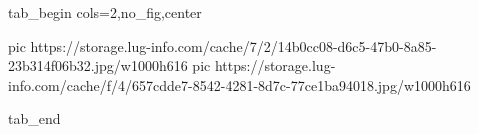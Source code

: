  
 
 
 
 


\ifcmt
  tab_begin cols=2,no_fig,center

     pic https://storage.lug-info.com/cache/7/2/14b0cc08-d6c5-47b0-8a85-23b314f06b32.jpg/w1000h616
		 pic https://storage.lug-info.com/cache/f/4/657cdde7-8542-4281-8d7c-77ce1ba94018.jpg/w1000h616

  tab_end
\fi
